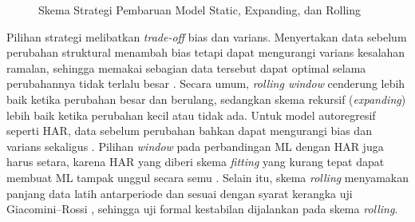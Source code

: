 \begin{figure}[htbp]
  \centering
  \caption{Skema Strategi Pembaruan Model Static, Expanding, dan Rolling}
  \label{fig:strategi}
\end{figure}

Pilihan strategi melibatkan \textit{trade-off} bias dan varians. Menyertakan
data sebelum perubahan struktural menambah bias tetapi dapat mengurangi
varians kesalahan ramalan, sehingga memakai sebagian data tersebut dapat
optimal selama perubahannya tidak terlalu besar \cite{pesaran2007}. Secara
umum, \textit{rolling window} cenderung lebih baik ketika perubahan besar dan
berulang, sedangkan skema rekursif (\textit{expanding}) lebih baik ketika
perubahan kecil atau tidak ada. Untuk model autoregresif seperti HAR, data
sebelum perubahan bahkan dapat mengurangi bias dan varians sekaligus
\cite{rossi2013}. Pilihan \textit{window} pada perbandingan ML dengan HAR juga
harus setara, karena HAR yang diberi skema \textit{fitting} yang kurang tepat
dapat membuat ML tampak unggul secara semu \cite{chassot2026}. Selain itu,
skema \textit{rolling} menyamakan panjang data latih antarperiode
\cite{tashman2000} dan sesuai dengan syarat kerangka uji Giacomini--Rossi
\cite{giacomini2010}, sehingga uji formal kestabilan dijalankan pada skema
\textit{rolling}.

